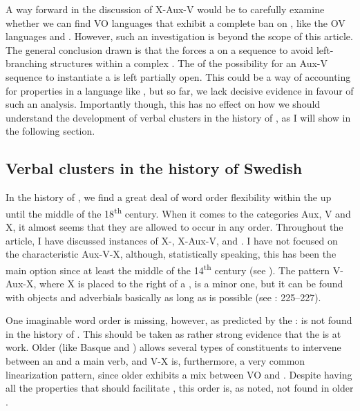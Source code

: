 \documentclass[output=paper, colorlinks, citecolor=brown]{langscibook}
\begin{document}
A way forward in the discussion of X-Aux-V would be to carefully examine whether we can find VO languages that exhibit a complete ban on , like the OV languages  and . However, such an investigation is beyond the scope of this article. The general conclusion drawn is that the  forces a  on a  sequence to avoid left-branching structures within a complex . The  of the possibility for an Aux-V sequence to instantiate a  is left partially open. This could be a way of accounting for  properties in a language like , but so far, we lack decisive evidence in favour of such an analysis. Importantly though, this  has no effect on how we should understand the development of verbal clusters in the history of , as I will show in the following section.


\subsection{Verbal clusters in the history of Swedish}\label{sec:sangfelt:5.3}

In the history of , we find a great deal of word order flexibility within the  up until the middle of the 18\textsuperscript{th} century. When it comes to the categories Aux, V and X, it almost seems that they are allowed to occur in any order. Throughout the article, I have discussed instances of X-, X-Aux-V, and . I have not focused on the characteristic  Aux-V-X, although, statistically speaking, this has been the main option since at least the middle of the 14\textsuperscript{th} century (see \citealt{Delsing1999,Petzell2011,Sangfelt2019}). The pattern V-Aux-X, where X is placed to the right of a , is a minor one, but it can be found with objects and adverbials basically as long as  is possible (see \citealt{Sangfelt2019}: 225–227).


One imaginable word order is missing, however, as predicted by the :  is not found in the history of . This should be taken as rather strong evidence that the  is at work. Older  (like Basque and ) allows several types of constituents to intervene between an  and a main verb, and V-X is, furthermore, a very common linearization pattern, since older  exhibits a mix between VO and . Despite having all the properties that should facilitate , this order is, as noted, not found in older .
\end{document}
